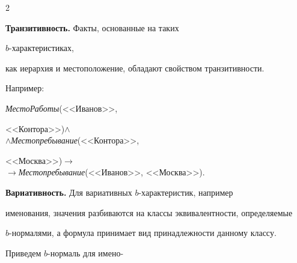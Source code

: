 \begin{multicols}{2}
  


  \medskip


  


  \textbf{Транзитивность.} Факты, основанные на таких\linebreak


   $b$-ха\-рак\-теристиках, 


как иерархия и местоположение, обладают свойством транзитивности. 




  \noindent


  Например: 


  


  \smallskip


  


  \noindent


  \textit{МестоРаботы}(<<Иванов>>, 


<<Контора>>)\;$\wedge$\\[-9pt]





$\wedge$\;\textit{Местопребывание}(<<Контора>>, 


<<Москва>>)\;$\rightarrow$\\[-9pt]





\hspace*{5mm}$\rightarrow$\;\textit{Местопребывание}(<<Иванов>>, <<Москва>>).





\smallskip


  


 


 \textbf{Вариативность.} Для вариативных $b$-ха\-рак\-те\-ри\-стик, например 


именования, значения разбиваются на классы эквивалентности, определяемые 


$b$-нор\-ма\-ля\-ми, а формула принимает вид принадлежности данному классу. 


Приведем $b$-нор\-маль для имено-\linebreak\vspace*{-12pt}





\pagebreak






\end{multicols}
